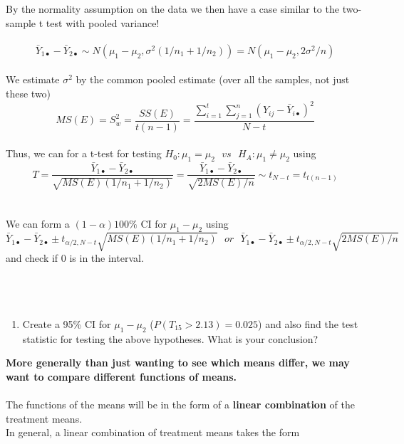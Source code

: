 By the normality assumption on the data we then have a case similar to the two-sample t test with pooled variance!\\~\\
$$\bar{Y}_{1\bullet}-\bar{Y}_{2\bullet}\sim N(\mu_1-\mu_2,\sigma^2(1/n_1+1/n_2)) = N(\mu_1-\mu_2,2\sigma^2/n) $$~\\

We estimate $\sigma^2$ by the common pooled estimate (over all the samples, not just these two)
$$MS(E)=S^2_w=\frac{SS(E)}{t(n-1)}=\frac{\sum_{i=1}^{t}\sum_{j=1}^{n}(Y_{ij}-\bar{Y}_{i\bullet})^2}{N-t}$$~\\

Thus, we can for a t-test for testing $H_0:\mu_1=\mu_2~~~vs~~~H_A:\mu_1\neq\mu_2$ using
$$T=\frac{\bar{Y}_{1\bullet}-\bar{Y}_{2\bullet}}{\sqrt{MS(E)(1/n_1+1/n_2)}}=\frac{\bar{Y}_{1\bullet}-\bar{Y}_{2\bullet}}{\sqrt{2MS(E)/n}}\sim t_{N-t}=t_{t(n-1)}$$~\\~\\
We can form a $(1-\alpha)100\%$ CI for $\mu_1-\mu_2$ using
$$\bar{Y}_{1\bullet}-\bar{Y}_{2\bullet}\pm t_{\alpha/2,N-t}\sqrt{MS(E)(1/n_1+1/n_2)}~~~or~~~\bar{Y}_{1\bullet}-\bar{Y}_{2\bullet}\pm t_{\alpha/2,N-t}\sqrt{2MS(E)/n}$$
and check if 0 is in the interval.\\~\\~\\~\\
\begin{enumerate}
\item Create a 95\% CI for $\mu_1-\mu_2$ ($P(T_{15}>2.13)=0.025$) and also find the test statistic for testing the above hypotheses.   What is your conclusion?
\end{enumerate}

\newpage

\Large\textbf{More generally than just wanting to see which means differ, we may want to compare different functions of means.}\large\\~\\
The functions of the means will be in the form of a \textbf{linear combination} of the treatment means.\\
In general, a linear combination of treatment means takes the form\\~\\~\\~\\~\\~\\

